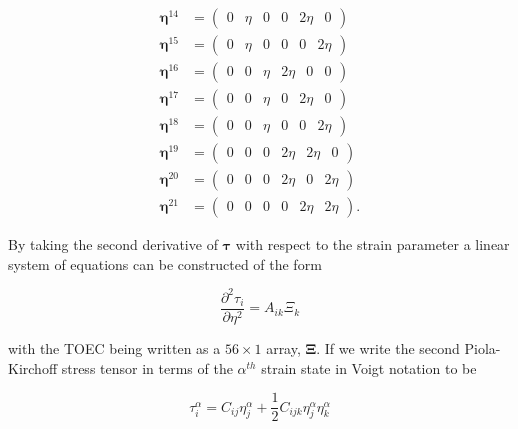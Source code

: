 \documentclass[showpacs,floatfix,aps,prb,preprint,superscriptaddress]{revtex4-1}
\begin{document}
\begin{widetext}
\begin{subequations}
\begin{align}
    	\bm{\eta}^{14} &=\left(\begin{matrix} 0 & \eta & 0 & 0 & 2\eta & 0 \end{matrix}\right)\\
    	\bm{\eta}^{15} &=\left(\begin{matrix} 0 & \eta & 0 & 0 & 0 & 2\eta \end{matrix}\right)\\
    	\bm{\eta}^{16} &=\left(\begin{matrix} 0 & 0 & \eta & 2\eta & 0 & 0 \end{matrix}\right)\\
    	\bm{\eta}^{17} &=\left(\begin{matrix} 0 & 0 & \eta & 0 & 2\eta & 0 \end{matrix}\right)\\
    	\bm{\eta}^{18} &=\left(\begin{matrix} 0 & 0 & \eta & 0 & 0 & 2\eta \end{matrix}\right)\\
    	\bm{\eta}^{19} &=\left(\begin{matrix} 0 & 0 & 0 & 2\eta & 2\eta & 0 \end{matrix}\right)\\
    	\bm{\eta}^{20} &=\left(\begin{matrix} 0 & 0 & 0 & 2\eta & 0 & 2\eta \end{matrix}\right)\\
    	\bm{\eta}^{21} &=\left(\begin{matrix} 0 & 0 & 0 & 0 & 2\eta & 2\eta \end{matrix}\right).
\end{align}
\end{subequations}
\end{widetext} 

\noindent By taking the second derivative of $\bm{\tau}$ with respect to the strain parameter a linear system of equations can be constructed of the form

\begin{equation}
\frac{\partial^2 \tau_i}{\partial \eta^2} = A_{ik} \Xi_k
\end{equation}


\noindent with the TOEC being written as a $56\times1$ array, $\bm{\Xi}$. If we write  the second Piola-Kirchoff stress tensor in terms of the $\alpha^{th}$ strain state in Voigt notation to be

\begin{equation}
\tau_i^{\alpha} = C_{ij} \eta_{j}^{\alpha} + \frac{1}{2}C_{ijk}  \eta_{j}^{\alpha}  \eta_{k}^{\alpha}
\end{equation}
\end{document}
